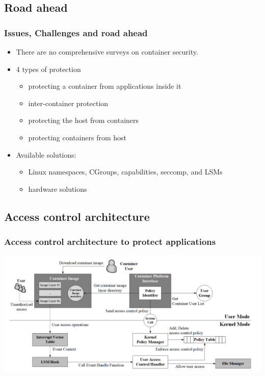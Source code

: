 \documentclass{beamer}
\begin{document}
\subsection{Road ahead}
\begin{frame}
    \frametitle{Issues, Challenges and road ahead}
    \begin{itemize}
        \item There are no comprehensive surveys on container security.
        \item 4 types of protection
              \begin{itemize}
                  \item protecting a container from applications inside it
                  \item inter-container protection
                  \item protecting the host from containers
                  \item protecting containers from host
              \end{itemize}
        \item Available solutions:
              \begin{itemize}
                  \item Linux namespaces, CGroups, capabilities, seccomp, and LSMs
                  \item hardware solutions
              \end{itemize}
    \end{itemize}
\end{frame}

\subsection{Access control architecture}
\begin{frame}
    \frametitle{Access control architecture to protect applications}
    \includegraphics[width=\textwidth]{architecture.png}\cite{Access_Control_Architecture}
\end{frame}
\end{document}
